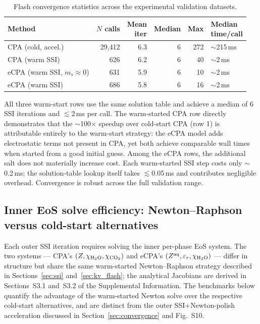 \documentclass[preprint,12pt,number]{elsarticle}
\begin{document}
\begin{table}[H]
  \centering
  \caption{Flash convergence statistics across the experimental validation datasets.}
  \label{tab:convergence}
  \begin{tabular}{lrrrrl}
    \toprule
     Method & \shortstack{$N$\\calls} & \shortstack{Mean\\iter} & Median & Max & \shortstack{Median\\time/call} \\
    \midrule
     CPA (cold, accel.)   & 29{,}412 &  6.3 &  6 & 272 & $\sim$215\,ms \\
     CPA (warm SSI)       &    626   &  6.2 &  6 &  40 & $\sim$2\,ms   \\
     \shortstack[l]{eCPA (warm SSI,\\$m_s\!\approx\!0$)} &    631   &  5.9 &  6 &  10 & $\sim$2\,ms   \\
    eCPA (warm SSI)      &    686   &  5.8 &  6 &  16 & $\sim$2\,ms   \\
    \bottomrule
  \end{tabular}
\end{table}
All three warm-start rows use the same solution table and achieve a median of
6 SSI iterations and $\lesssim$2\,ms per call.
The warm-started CPA row directly demonstrates that the $\sim$100$\times$ speedup
over cold-start CPA (row 1) is attributable entirely to the warm-start strategy:
the eCPA model adds electrostatic terms not present in CPA, yet both achieve
comparable wall times when started from a good initial guess.
Among the eCPA rows, the additional salt does not materially increase cost.
Each warm-started SSI step costs only $\sim$0.2\,ms; the solution-table lookup
itself takes $\lesssim$0.05\,ms and contributes negligible overhead.
Convergence is robust across the full validation range.

\subsection{Inner EoS solve efficiency: Newton--Raphson versus cold-start alternatives}
\label{sec:inner_newton_perf}

Each outer SSI iteration requires solving the inner per-phase EoS system.
The two systems — CPA's $(Z, \chi_{\rm H_2O}, \chi_{\rm CO_2})$ and eCPA's $(Z^{\rm aq}, \varepsilon_r, \chi_{\rm H_2O})$
— differ in structure but share the same warm-started Newton--Raphson strategy
described in Sections~\ref{sec:ssi} and~\ref{sec:kv_flash};
the analytical Jacobians are derived in Sections~S3.1 and~S3.2 of the Supplemental Information.
The benchmarks below quantify the advantage of the warm-started Newton solve
over the respective cold-start alternatives, and are distinct from the outer
SSI$+$Newton-polish acceleration discussed in Section~\ref{sec:convergence}
and Fig.~S10.
\end{document}
